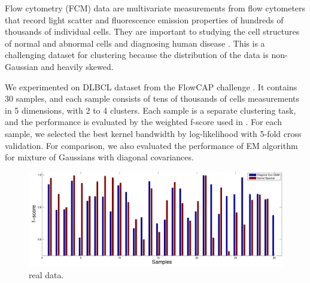 
Flow cytometry (FCM) data are multivariate measurements from flow cytometers that record light scatter and fluorescence emission properties of hundreds of thousands of individual cells. They are important to studying the cell structures of normal and abnormal cells and diagnosing human disease \cite{cytometry_nature}. This is a challenging dataset for clustering because the distribution of the data is non-Gaussian and heavily skewed.

We experimented on DLBCL dataset from the FlowCAP challenge \cite{cytometry_nature}. It contains 30 samples, and each sample consists of tens of thousands of cells measurements in 5 dimensions, with 2 to 4 clusters. Each sample is a separate clustering task, and the performance is evaluated by the weighted f-score used in \cite{cytometry_nature}. For each sample, we selected the best kernel bandwidth by log-likelihood with 5-fold cross validation. For comparison, we also evaluated the performance of EM algorithm for mixture of Gaussians with diagonal covariances.


\begin{figure}[h]
  \centering
  \includegraphics[width=0.9\columnwidth]{../experiment/figure/paired_bar_chat} 
   \vspace{-3mm}
  \caption{real data.}\label{fig:real_data}
  \vspace{-3mm}
\end{figure}
